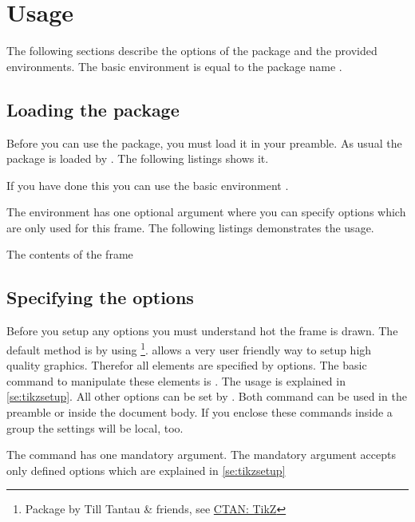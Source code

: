 \documentclass[openany,12pt,tocdepth=3]{ltx-md}
\begin{document}
\chapter{Usage}\label{chap:usage}
The following sections describe the options of the package and the provided 
environments. The basic environment is equal to the package name .

\section{Loading the package}
Before you can use the package, you must load it in your preamble. As usual the 
package is loaded by . The following listings shows it.
\begin{ltxexample}[caption=Loading the package,label=loading]
 \usepackage{xframed}
\end{ltxexample}
If you have done this you can use the basic environment .

The environment has one optional argument where you can specify options
which are only used for this frame. The following listings demonstrates the usage.
\begin{ltxexample}[caption=Loading the package,label=loading]
 \begin{xframed}
   The contents of the frame
 \end{xframed}
\end{ltxexample}

\section{Specifying the options}\label{sec:specopt}
Before you setup any options you must understand hot the frame is drawn.
The default method is by using \footnote{Package  by 
Till Tantau \& friends, see \href{http://www.ctan.org/pkg/pgf}{CTAN: TikZ}}. 
 allows a very user friendly way to setup high quality graphics. 
Therefor all elements are specified by  options. The basic command
to manipulate these elements is . The usage is explained
in \autoref{se:tikzsetup}.  All other options can be set by . 
Both command can be used in the preamble or inside the document body. If
you enclose these commands inside a group the settings will be local, too.
 
The command has one mandatory argument. The mandatory argument accepts only
defined options which are explained in \autoref{se:tikzsetup}
\end{document}
